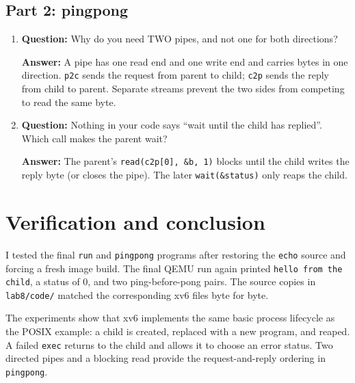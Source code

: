 \documentclass[12pt]{article}
\begin{document}
\subsection{Part 2: pingpong}
\begin{enumerate}
\item \textbf{Question:} Why do you need TWO pipes, and not one for both directions?
\par\textbf{Answer:} A pipe has one read end and one write end and carries bytes in one direction. \texttt{p2c} sends the request from parent to child; \texttt{c2p} sends the reply from child to parent. Separate streams prevent the two sides from competing to read the same byte.

\item \textbf{Question:} Nothing in your code says ``wait until the child has replied''. Which call makes the parent wait?
\par\textbf{Answer:} The parent's \texttt{read(c2p[0], \&b, 1)} blocks until the child writes the reply byte (or closes the pipe). The later \texttt{wait(\&status)} only reaps the child.
\end{enumerate}

\clearpage
\section{Verification and conclusion}
I tested the final \texttt{run} and \texttt{pingpong} programs after
restoring the \texttt{echo} source and forcing a fresh image build. The
final QEMU run again printed \texttt{hello from the child}, a status of
0, and two ping-before-pong pairs. The source copies in
\texttt{lab8/code/} matched the corresponding xv6 files byte for byte.

The experiments show that xv6 implements the same basic process
lifecycle as the POSIX example: a child is created, replaced with a new
program, and reaped. A failed \texttt{exec} returns to the child and
allows it to choose an error status. Two directed pipes and a blocking
read provide the request-and-reply ordering in \texttt{pingpong}.
\end{document}
